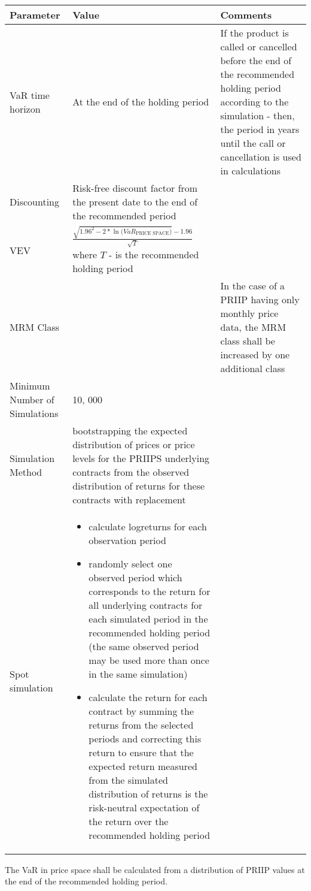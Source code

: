 \documentclass{report}
\begin{document}
\begin{center}
	\begin{tabular}{ | p{3cm} | p{6cm} | p{6cm} |}
		\hline
		\textbf{Parameter} & \textbf{Value} & \textbf{Comments} \\ 
		\hline
		VaR time horizon & At the end of the holding period & If the product is
		called or cancelled before the end of the recommended holding period according to the simulation - then, the period in years until the call or cancellation is used in calculations \\  
		\hline
		Discounting & Risk-free discount factor from the present date to the end of the recommended period & \\
		\hline
		VEV & $\frac{\sqrt{1.96^{2} - 2 * \ln{\Big(VaR_{\text{PRICE SPACE}}\Big)}} - 1.96}{\sqrt{T}}$ where $T$ - is the recommended holding period & \\
		\hline
		MRM Class &  &In the case of a PRIIP having only monthly price data, the MRM class shall be increased by one additional class\\
		\hline
		Minimum Number of Simulations & 10, 000 &\\
		\hline
		Simulation Method & bootstrapping the expected distribution of prices or price levels for the PRIIPS underlying contracts from the observed distribution of returns for these contracts with replacement &\\
		\hline
		Spot simulation & \begin{itemize}
			\item calculate logreturns for each observation period
			\item randomly select one observed period which corresponds to the return for all underlying contracts for each simulated period in the recommended holding period (the same observed period may be used more than once in the same simulation)
			\item calculate the return for each contract by summing the returns from the selected periods and correcting this return to ensure that the expected return measured from the simulated distribution of returns is the risk-neutral expectation of the return over the recommended holding period
		\end{itemize} & \\
		\hline
	\end{tabular}
\end{center}


The VaR in price space shall be calculated from a distribution of PRIIP values at the end of the recommended holding period. 
	
\end{document}
